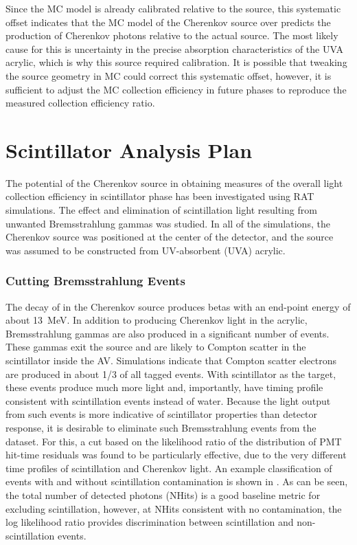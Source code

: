 Since the MC model is already calibrated relative to the \N source, this systematic offset indicates that the MC model of the Cherenkov source over predicts the production of Cherenkov photons relative to the actual source.
The most likely cause for this is uncertainty in the precise absorption characteristics of the UVA acrylic, which is why this source required calibration.
It is possible that tweaking the source geometry in MC could correct this systematic offset, however, it is sufficient to adjust the MC collection efficiency in future phases to reproduce the measured collection efficiency ratio.


\section{Scintillator Analysis Plan}
The potential of the Cherenkov source in obtaining measures of the overall light collection efficiency in scintillator phase has been investigated using RAT simulations. 
The effect and elimination of scintillation light resulting from unwanted Bremsstrahlung gammas was studied.  
In all of the simulations, the Cherenkov source was positioned at the center of the detector, and the source was assumed to be constructed from UV-absorbent (UVA) acrylic.
 
\subsubsection{Cutting Bremsstrahlung Events}

The decay of \Li in the Cherenkov source produces betas with an end-point energy of about 13~MeV. 
In addition to producing Cherenkov light in the acrylic, Bremsstrahlung gammas are also produced in a significant number of events.  
These gammas exit the source and are likely to Compton scatter in the scintillator inside the AV.  
Simulations indicate that Compton scatter electrons are produced in about 1/3 of all tagged events.  
With scintillator as the target, these events produce much more light and, importantly, have timing profile consistent with scintillation events instead of water.  
Because the light output from such events is more indicative of scintillator properties than detector response, it is desirable to eliminate such Bremsstrahlung events from the dataset.
For this, a cut based on the likelihood ratio of the distribution of PMT hit-time residuals was found to be particularly effective, due to the very different time profiles of scintillation and Cherenkov light.
An example classification of events with and without scintillation contamination is shown in .
As can be seen, the total number of detected photons (NHits) is a good baseline metric for excluding scintillation, however, at NHits consistent with no contamination, the log likelihood ratio provides discrimination between scintillation and non-scintillation events. 

